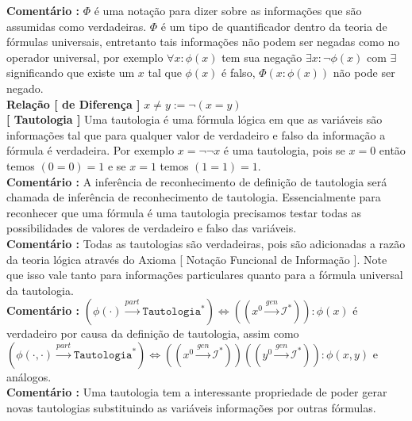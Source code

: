 \documentclass[10pt,a4paper]{report}
\begin{document}
\textbf{Comentário :} $\Phi$ é uma notação para dizer sobre as informações que são assumidas como verdadeiras. $\Phi$ é um tipo de quantificador dentro da teoria de fórmulas universais, entretanto tais informações não podem ser negadas como no operador universal, por exemplo $\forall x :\phi(x)$ tem sua negação $\exists x : \neg \phi(x)$ com $\exists$ significando que existe um $x$ tal que $\phi(x)$ é falso, $\Phi( x : \phi(x) )$ não pode ser negado.\\

\textbf{Relação [ de Diferença ]} $ x \neq y := \neg (x = y) $\\

\textbf{[ Tautologia ]} Uma tautologia é uma fórmula lógica em que as variáveis são informações tal que para qualquer valor de verdadeiro e falso da informação a fórmula é verdadeira. Por exemplo $ x = \neg \neg x $ é uma tautologia, pois se $x=0$ então temos $(0=0)=1$ e se $x=1$ temos $ (1=1) = 1 $.\\

\textbf{Comentário :} A inferência de reconhecimento de definição de tautologia será chamada de inferência de reconhecimento de tautologia. Essencialmente para reconhecer que uma fórmula é uma tautologia precisamos testar todas as possibilidades de valores de verdadeiro e falso das variáveis.\\

\textbf{Comentário :} Todas as tautologias são verdadeiras, pois são adicionadas a razão da teoria lógica através do Axioma [ Notação Funcional de Informação ]. Note que isso vale tanto para informações particulares quanto para a fórmula universal da tautologia.\\

\textbf{Comentário :} $ ( \phi(\cdot) \overset{part}{\rightarrow} \texttt{Tautologia}^* ) \iff (( x^0 \overset{gen}{\rightarrow} \mathcal{I}^* )) : \phi(x) $ é verdadeiro por causa da definição de tautologia, assim como $ ( \phi(\cdot, \cdot) \overset{part}{\rightarrow} \texttt{Tautologia}^* ) \iff (( x^0 \overset{gen}{\rightarrow} \mathcal{I}^* )) (( y^0 \overset{gen}{\rightarrow} \mathcal{I}^* )) : \phi(x,y) $ e análogos.\\

\textbf{Comentário :} Uma tautologia tem a interessante propriedade de poder gerar novas tautologias substituindo as variáveis informações por outras fórmulas.

\hspace{\baselineskip}
\end{document}
